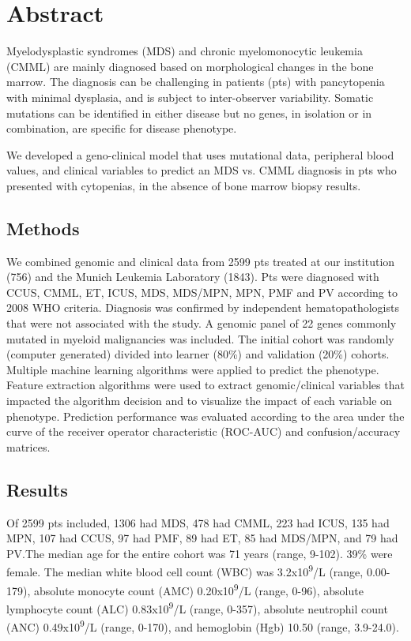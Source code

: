 \section{Abstract}%

Myelodysplastic syndromes (MDS) and chronic myelomonocytic leukemia (CMML) are mainly diagnosed based on morphological changes in the bone marrow. The diagnosis can be challenging in patients (pts) with pancytopenia with minimal dysplasia, and is subject to inter-observer variability. Somatic mutations can be identified in either disease but no genes, in isolation or in combination, are specific for disease phenotype.

We developed a geno-clinical model that uses mutational data, peripheral blood values, and clinical variables to predict an MDS vs. CMML diagnosis in pts who presented with cytopenias, in the absence of bone marrow biopsy results.


\subsection{Methods}%

We combined genomic and clinical data from 2599 pts treated at our institution (756) and the Munich Leukemia Laboratory (1843). Pts were diagnosed with CCUS, CMML, ET, ICUS, MDS, MDS/MPN, MPN, PMF and PV according to 2008 WHO criteria. Diagnosis was confirmed by independent hematopathologists that were not associated with the study. A genomic panel of 22 genes commonly mutated in myeloid malignancies was included. The initial cohort was randomly (computer generated) divided into learner (80\%) and validation (20\%) cohorts. Multiple machine learning algorithms were applied to predict the phenotype. Feature extraction algorithms were used to extract genomic/clinical variables that impacted the algorithm decision and to visualize the impact of each variable on phenotype. Prediction performance was evaluated according to the area under the curve of the receiver operator characteristic (ROC-AUC) and confusion/accuracy matrices.


\subsection{Results}%

Of 2599 pts included, 1306 had MDS, 478 had CMML, 223 had ICUS, 135 had MPN, 107 had CCUS, 97 had PMF, 89 had ET, 85 had MDS/MPN, and 79 had PV.The median age for the entire cohort was 71 years (range, 9-102). 39\% were female. The median white blood cell count (WBC) was 3.2x10\textsuperscript{9}/L (range, 0.00-179), absolute monocyte count (AMC) 0.20x10\textsuperscript{9}/L (range, 0-96), absolute lymphocyte count (ALC) 0.83x10\textsuperscript{9}/L (range, 0-357), absolute neutrophil count (ANC) 0.49x10\textsuperscript{9}/L (range, 0-170), and hemoglobin (Hgb)  10.50 (range, 3.9-24.0). 

